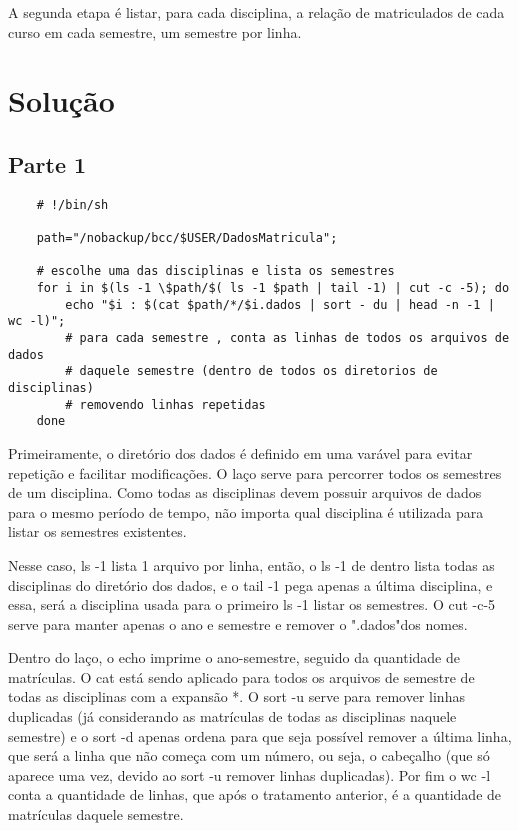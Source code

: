 \documentclass[oneside, 11 pt]{article}
\begin{document}
	A segunda etapa é listar, para cada disciplina, a relação de matriculados de cada curso em cada semestre, um semestre por linha.
	
	\section{Solução}
	
	\subsection{Parte 1}
	
	\begin{lstlisting}
	# !/bin/sh
	
	path="/nobackup/bcc/$USER/DadosMatricula";
	
	# escolhe uma das disciplinas e lista os semestres
	for i in $(ls -1 \$path/$( ls -1 $path | tail -1) | cut -c -5); do
	    echo "$i : $(cat $path/*/$i.dados | sort - du | head -n -1 | wc -l)";
	    # para cada semestre , conta as linhas de todos os arquivos de dados
	    # daquele semestre (dentro de todos os diretorios de disciplinas)
	    # removendo linhas repetidas
	done

	\end{lstlisting}
	
	Primeiramente, o diretório dos dados é definido em uma varável para evitar repetição e facilitar modificações. O laço serve para percorrer todos os semestres de um disciplina. Como todas as disciplinas devem possuir arquivos de dados para o mesmo período de tempo, não importa qual disciplina é utilizada para listar os semestres existentes.
	
	Nesse caso, ls -1 lista 1 arquivo por linha, então, o ls -1 de dentro lista todas as disciplinas do diretório dos dados, e o tail -1 pega apenas a última disciplina, e essa, será a disciplina usada para o primeiro ls -1 listar os semestres. O cut -c-5 serve para manter apenas o ano e semestre e remover o ".dados"dos nomes.
	
	Dentro do laço, o echo imprime o ano-semestre, seguido da quantidade de matrículas. O cat está sendo aplicado para todos os arquivos de semestre de todas as disciplinas com a expansão *. O sort -u serve para remover linhas duplicadas (já considerando as matrículas de todas as disciplinas naquele semestre) e o sort -d apenas ordena para que seja possível remover a última linha, que será a linha que não começa com um número, ou seja, o cabeçalho (que só aparece uma vez, devido ao sort -u remover linhas duplicadas). Por fim o wc -l conta a quantidade de linhas, que após o tratamento anterior, é a quantidade de matrículas daquele semestre.
\end{document}
